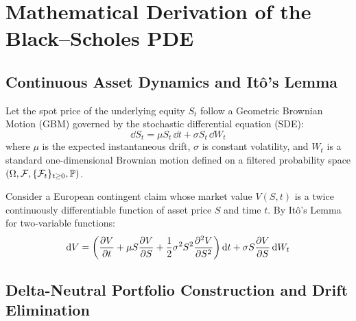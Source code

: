
\section{Mathematical Derivation of the Black--Scholes PDE}
\label{sec:black_scholes_pde}

\subsection{Continuous Asset Dynamics and Itô's Lemma}

Let the spot price of the underlying equity $S_t$ follow a Geometric Brownian Motion (GBM) governed by the stochastic differential equation (SDE):
\begin{equation}
    \dd S_t = \mu S_t \, \dd t + \sigma S_t \, \dd W_t
    \label{eq:gbm_underlying}
\end{equation}
where $\mu$ is the expected instantaneous drift, $\sigma$ is constant volatility, and $W_t$ is a standard one-dimensional Brownian motion defined on a filtered probability space $(\Omega, \mathcal{F}, \{\mathcal{F}_t\}_{t \ge 0}, \mathbb{P})$.

Consider a European contingent claim whose market value $V(S, t)$ is a twice continuously differentiable function of asset price $S$ and time $t$. By Itô's Lemma for two-variable functions:
\begin{equation}
    \mathrm{d} V = \left( \frac{\partial V}{\partial t} + \mu S \frac{\partial V}{\partial S} + \frac{1}{2}\sigma^2 S^2 \frac{\partial^2 V}{\partial S^2} \right) \mathrm{d} t + \sigma S \frac{\partial V}{\partial S} \, \mathrm{d} W_t
    \label{eq:ito_claim}
\end{equation}

\subsection{Delta-Neutral Portfolio Construction and Drift Elimination}

